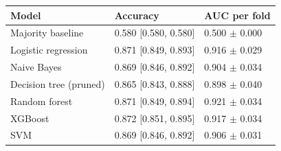 \begin{tabular}{lll}
\toprule
\textbf{Model} & \textbf{Accuracy} & \textbf{AUC per fold} \\
\midrule
Majority baseline & 0.580 [0.580, 0.580] & 0.500 $\pm$ 0.000 \\
Logistic regression & 0.871 [0.849, 0.893] & 0.916 $\pm$ 0.029 \\
Naive Bayes & 0.869 [0.846, 0.892] & 0.904 $\pm$ 0.034 \\
Decision tree (pruned) & 0.865 [0.843, 0.888] & 0.898 $\pm$ 0.040 \\
Random forest & 0.871 [0.849, 0.894] & 0.921 $\pm$ 0.034 \\
XGBoost & 0.872 [0.851, 0.895] & 0.917 $\pm$ 0.034 \\
SVM & 0.869 [0.846, 0.892] & 0.906 $\pm$ 0.031 \\
\bottomrule
\end{tabular}
